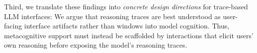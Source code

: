 \documentclass[acmlarge,review=true, anonymous=true]{acmart}
\begin{document}
Third, we translate these findings into \textit{concrete design directions} for trace-based LLM interfaces: We argue that reasoning traces are best understood as user-facing interface artifacts rather than windows into model cognition. Thus, metacognitive support must instead be scaffolded by interactions that elicit users' own reasoning before exposing the model's reasoning traces.





\end{document}
